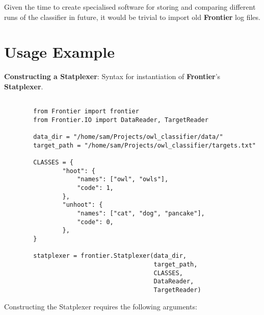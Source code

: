 Given the time to create specialised software for storing and comparing
different runs of the classifier in future, it would be trivial to import old
\textbf{Frontier} log files.


\section{Usage Example}

\begin{listing}[H]
    \caption[callstatplexer]{\textbf{Constructing a Statplexer}: Syntax for
    instantiation of \textbf{Frontier}'s \textbf{Statplexer}.}
    \label{list:callstatplexer}
    \begin{verbatim}

        from Frontier import frontier
        from Frontier.IO import DataReader, TargetReader

        data_dir = "/home/sam/Projects/owl_classifier/data/"
        target_path = "/home/sam/Projects/owl_classifier/targets.txt"

        CLASSES = {
                "hoot": {
                    "names": ["owl", "owls"],
                    "code": 1,
                },
                "unhoot": {
                    "names": ["cat", "dog", "pancake"],
                    "code": 0,
                },
        }

        statplexer = frontier.Statplexer(data_dir,
                                         target_path,
                                         CLASSES,
                                         DataReader,
                                         TargetReader)
    \end{verbatim}
\end{listing}

Constructing the Statplexer requires the following arguments:

